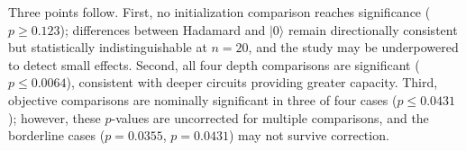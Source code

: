\documentclass[runningheads]{llncs}
\begin{document}
\begin{table}[h!]
\caption{Wilcoxon signed-rank test results on best cost, paired by seed ($n = 20$). Nominal significance threshold: $p < 0.05$ (uncorrected).}
\label{tab:wilcoxon}
\centering
{}
\end{table}

Three points follow. First, no initialization comparison reaches significance ($p \geq 0.123$); differences between Hadamard and $|0\rangle$ remain directionally consistent but statistically indistinguishable at $n = 20$, and the study may be underpowered to detect small effects. Second, all four depth comparisons are significant ($p \leq 0.0064$), consistent with deeper circuits providing greater capacity. Third, objective comparisons are nominally significant in three of four cases ($p \leq 0.0431$); however, these $p$-values are uncorrected for multiple comparisons, and the borderline cases ($p = 0.0355$, $p = 0.0431$) may not survive correction.
\end{document}
